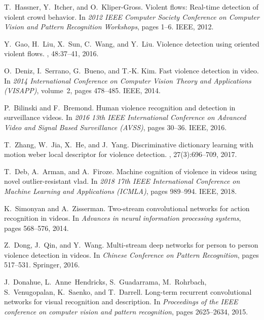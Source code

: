 \documentclass[10pt,twocolumn,letterpaper]{article}
\begin{document}
{\begin{thebibliography}{10}
T.~Hassner, Y.~Itcher, and O.~Kliper-Gross.
\newblock Violent flows: Real-time detection of violent crowd behavior.
\newblock In {\em 2012 IEEE Computer Society Conference on Computer Vision and
	Pattern Recognition Workshops}, pages 1--6. IEEE, 2012.

Y.~Gao, H.~Liu, X.~Sun, C.~Wang, and Y.~Liu.
\newblock Violence detection using oriented violent flows.
, 48:37--41, 2016.

O.~Deniz, I.~Serrano, G.~Bueno, and T.-K. Kim.
\newblock Fast violence detection in video.
\newblock In {\em 2014 International Conference on Computer Vision Theory and
	Applications (VISAPP)}, volume~2, pages 478--485. IEEE, 2014.

P.~Bilinski and F.~Bremond.
\newblock Human violence recognition and detection in surveillance videos.
\newblock In {\em 2016 13th IEEE International Conference on Advanced Video and
	Signal Based Surveillance (AVSS)}, pages 30--36. IEEE, 2016.

T.~Zhang, W.~Jia, X.~He, and J.~Yang.
\newblock Discriminative dictionary learning with motion weber local descriptor
	for violence detection.
,
	27(3):696--709, 2017.

T.~Deb, A.~Arman, and A.~Firoze.
\newblock Machine cognition of violence in videos using novel outlier-resistant
	vlad.
\newblock In {\em 2018 17th IEEE International Conference on Machine Learning
	and Applications (ICMLA)}, pages 989--994. IEEE, 2018.

K.~Simonyan and A.~Zisserman.
\newblock Two-stream convolutional networks for action recognition in videos.
\newblock In {\em Advances in neural information processing systems}, pages
	568--576, 2014.

Z.~Dong, J.~Qin, and Y.~Wang.
\newblock Multi-stream deep networks for person to person violence detection in
	videos.
\newblock In {\em Chinese Conference on Pattern Recognition}, pages 517--531.
	Springer, 2016.

J.~Donahue, L.~Anne~Hendricks, S.~Guadarrama, M.~Rohrbach, S.~Venugopalan,
	K.~Saenko, and T.~Darrell.
\newblock Long-term recurrent convolutional networks for visual recognition and
	description.
\newblock In {\em Proceedings of the IEEE conference on computer vision and
	pattern recognition}, pages 2625--2634, 2015.


\end{thebibliography}}
\end{document}
